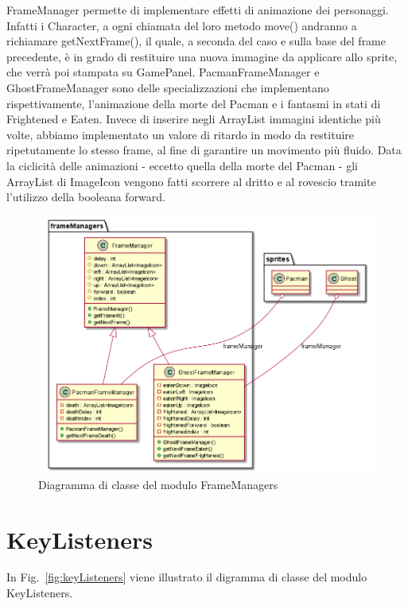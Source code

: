 \documentclass[12pt,a4paper]{report}
\begin{document}
FrameManager permette di implementare effetti di animazione dei personaggi. Infatti i Character, a ogni chiamata del loro metodo move() andranno a richiamare getNextFrame(), il quale, a seconda del caso e sulla base del frame precedente, è in grado di restituire una nuova immagine da applicare allo sprite, che verrà poi stampata su GamePanel. 
PacmanFrameManager  e GhostFrameManager sono delle specializzazioni che implementano rispettivamente, l’animazione della morte del Pacman e i fantasmi in stati di Frightened e Eaten. 
Invece di inserire negli ArrayList immagini identiche più volte, abbiamo implementato un valore di ritardo in modo da restituire ripetutamente lo stesso frame, al fine di garantire un movimento più fluido. 
Data la ciclicità delle animazioni - eccetto quella della morte del Pacman - gli ArrayList di ImageIcon vengono fatti scorrere al dritto e al rovescio tramite l’utilizzo della booleana forward.

\begin{figure}[tb]
\begin{center}
  \includegraphics[width=15cm]{frameManagers}
\end{center}
  \caption{Diagramma di classe del modulo FrameManagers}
  \label{fig:frameManagers}
\end{figure}


\section{KeyListeners}\label{se:arch.keyListeners}
In Fig.~\ref{fig:keyListeners} viene illustrato il digramma di classe del modulo KeyListeners.\newline
\end{document}
